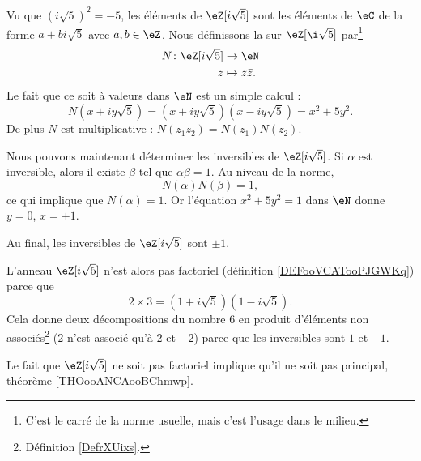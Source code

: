 \begin{example}     \label{EXooYCTDooGXAjGC}
    Vu que \( (i\sqrt{ 5 })^2=-5\), les éléments de \( \eZ[i\sqrt{ 5 }]\) sont les éléments de \( \eC\) de la forme \( a+bi\sqrt{ 5 }\) avec \( a,b\in \eZ\). Nous définissons la  sur \( \eZ[\i\sqrt{ 5 }]\) par\footnote{C'est le carré de la norme usuelle, mais c'est l'usage dans le milieu.}
    \begin{equation}
        \begin{aligned}
            N\colon \eZ[i\sqrt{ 5 }]&\to \eN \\
            z&\mapsto z\bar z. 
        \end{aligned}
    \end{equation}
    Le fait que ce soit à valeurs dans \( \eN\) est un simple calcul :
    \begin{equation}
        N(x+iy\sqrt{ 5 })=(x+iy\sqrt{ 5 })(x-iy\sqrt{ 5 })=x^2+5y^2.
    \end{equation}
    De plus \( N\) est multiplicative : \( N(z_1z_2)=N(z_1)N(z_2)\).

    Nous pouvons maintenant déterminer les inversibles de \( \eZ[i\sqrt{ 5 }]\). Si \( \alpha\) est inversible, alors il existe \( \beta\) tel que \( \alpha\beta=1\). Au niveau de la norme, 
    \begin{equation}
        N(\alpha)N(\beta)=1,
    \end{equation}
    ce qui implique que \( N(\alpha)=1\). Or l'équation \( x^2+5y^2=1\) dans \( \eN\) donne \( y=0\), \( x=\pm 1\).

    Au final, les inversibles de \( \eZ[i\sqrt{ 5 }]\) sont \( \pm 1\).

    L'anneau \( \eZ[i\sqrt{ 5 }]\) n'est alors pas factoriel (définition \ref{DEFooVCATooPJGWKq}) parce que 
    \begin{equation}
        2\times 3=(1+i\sqrt{ 5 })(1-i\sqrt{ 5 }).
    \end{equation}
    Cela donne deux décompositions du nombre \( 6\) en produit d'éléments non associés\footnote{Définition \ref{DefrXUixs}.} (\( 2\) n'est associé qu'à \( 2\) et \( -2\)) parce que les inversibles sont \( 1\) et \( -1\).

    Le fait que \( \eZ[i\sqrt{ 5 }]\) ne soit pas factoriel implique qu'il ne soit pas principal, théorème \ref{THOooANCAooBChmwp}.
\end{example}
